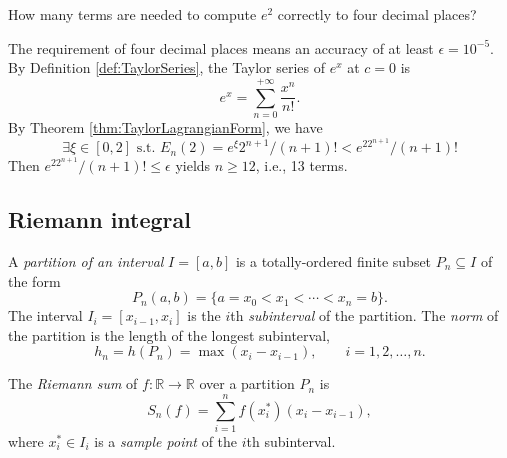 \begin{exm}
  \label{exm:approximatingExponentialFunction}
  How many terms are needed to compute $e^2$ correctly to four decimal
  places?

  The requirement of four decimal places means
  an accuracy of at least $\epsilon=10^{-5}$.
By Definition \ref{def:TaylorSeries}, 
   the Taylor series of $e^x$ at $c=0$ is
  \begin{equation*}
    e^x = \sum_{n=0}^{+\infty}\frac{x^n}{n!}.
  \end{equation*}
  By Theorem \ref{thm:TaylorLagrangianForm}, we have
  \begin{equation*}
    \exists \xi\in [0,2] \text{ s.t. }
    E_n(2)=e^{\xi}2^{n+1}/(n+1)! < e^22^{n+1}/(n+1)!
  \end{equation*}
  Then $e^22^{n+1}/(n+1)!\le \epsilon$ yields $n\ge 12$, i.e., 13 terms.
\end{exm}


\subsection{Riemann integral}
\label{sec:RiemannIntegral}

\begin{defn}
  \label{def:partitionOfInterval}
  A \emph{partition of an interval} $I=[a, b]$
  is a totally-ordered finite subset $P_n\subseteq I$ of the form
  \begin{equation}
    \label{eq:partition}
    P_n(a,b) = \{a=x_0 < x_1 < \cdots < x_n=b\}.
  \end{equation}
  The interval $I_i=[x_{i-1}, x_{i}]$ is the $i$th
   \emph{subinterval} of the partition.
  The \emph{norm} of the partition
  is the length of the longest subinterval,
  \begin{equation}
    h_n= h(P_n) = \max(x_i-x_{i-1}),\qquad i=1, 2, \ldots, n.
  \end{equation}
\end{defn}

\begin{defn}
  \label{def:RiemannSum}
  The \emph{Riemann sum} of %
  $f: \mathbb{R}\rightarrow \mathbb{R}$
  over a partition $P_n$ is
  \begin{equation}
    \label{eq:RiemannSum}
    S_n(f) = \sum_{i=1}^n f(x_i^*) (x_{i}-x_{i-1}),
  \end{equation}
  where $x_i^*\in I_i$ 
  is a \emph{sample point} %
  of the $i$th subinterval.
\end{defn}

